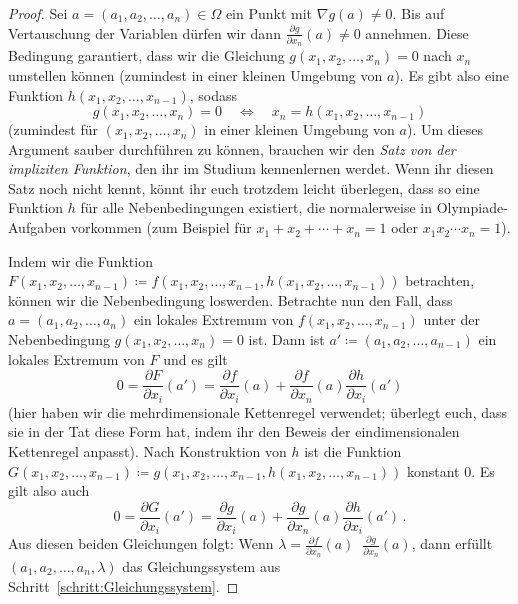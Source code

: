 \begin{proof}
	Sei $a=(a_1,a_2,\dotsc,a_n)\in\Omega$ ein Punkt mit $\nabla g(a)\neq 0$. Bis auf Vertauschung der Variablen dürfen wir dann $\frac{\partial g}{\partial x_n}(a)\neq 0$ annehmen. Diese Bedingung garantiert, dass wir die Gleichung $g(x_1,x_2,\dotsc,x_n)=0$ nach $x_n$ umstellen können (zumindest in einer kleinen Umgebung von $a$). Es gibt also eine Funktion $h(x_1,x_2,\dotsc,x_{n-1})$, sodass
	\begin{equation*}
		g(x_1,x_2,\dotsc,x_n)=0\quad\Longleftrightarrow \quad x_n=h(x_1,x_2,\dotsc,x_{n-1})
	\end{equation*}
	(zumindest für $(x_1,x_2,\dotsc,x_n)$ in einer kleinen Umgebung von $a$). Um dieses Argument sauber durchführen zu können, brauchen wir den \emph{Satz von der impliziten Funktion}, den ihr im Studium kennenlernen werdet. Wenn ihr diesen Satz noch nicht kennt, könnt ihr euch trotzdem leicht überlegen, dass so eine Funktion $h$ für alle Nebenbedingungen existiert, die normalerweise in Olympiade-Aufgaben vorkommen (zum Beispiel für $x_1+x_2+\dotsb+x_n=1$ oder $x_1x_2\dotsm x_n=1$).
	
	Indem wir die Funktion $F(x_1,x_2,\dotsc,x_{n-1})\coloneqq f(x_1,x_2,\dotsc,x_{n-1},h(x_1,x_2,\dotsc,x_{n-1}))$ betrachten, können wir die Nebenbedingung loswerden. Betrachte nun den Fall, dass $a=(a_1,a_2,\dotsc,a_n)$ ein lokales Extremum von $f(x_1,x_2,\dotsc,x_{n-1})$ unter der Nebenbedingung $g(x_1,x_2,\dotsc,x_n)=0$ ist. Dann ist $a'\coloneqq (a_1,a_2,\dotsc,a_{n-1})$ ein lokales Extremum von $F$ und es gilt
	\begin{equation*}
		0=\frac{\partial F}{\partial x_i}(a')=\frac{\partial f}{\partial x_i}(a)+\frac{\partial f}{\partial x_n}(a)\frac{\partial h}{\partial x_i}(a')
	\end{equation*}
	(hier haben wir die mehrdimensionale Kettenregel verwendet; überlegt euch, dass sie in der Tat diese Form hat, indem ihr den Beweis der eindimensionalen Kettenregel anpasst). Nach Konstruktion von $h$ ist die Funktion $G(x_1,x_2,\dotsc,x_{n-1})\coloneqq g(x_1,x_2,\dotsc,x_{n-1},h(x_1,x_2,\dotsc,x_{n-1}))$ konstant $0$. Es gilt also auch
	\begin{equation*}
		0=\frac{\partial G}{\partial x_i}(a')=\frac{\partial g}{\partial x_i}(a)+\frac{\partial g}{\partial x_n}(a)\frac{\partial h}{\partial x_i}(a')\,.
	\end{equation*}
	Aus diesen beiden Gleichungen folgt: Wenn $\lambda=\frac{\partial f}{\partial x_n}(a)\mathop{\big/}\frac{\partial g}{\partial x_n}(a)$, dann erfüllt $(a_1,a_2,\dotsc,a_n,\lambda)$ das Gleichungssystem aus Schritt~\ref{schritt:Gleichungssystem}.
	

\end{proof}
